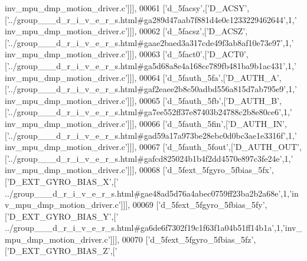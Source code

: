 \begin{DoxyCode}
{      inv\_mpu\_dmp\_motion\_driver.c'}]]],
00061   [\textcolor{stringliteral}{'d\_5facsy'},[\textcolor{stringliteral}{'D\_ACSY'},[\textcolor{stringliteral}{'../group\_\_\_d\_r\_i\_v\_e\_r\_s.html#ga289d47aab7f881d4e0c1233229462644'},1,\textcolor{stringliteral}{'
      inv\_mpu\_dmp\_motion\_driver.c'}]]],
00062   [\textcolor{stringliteral}{'d\_5facsz'},[\textcolor{stringliteral}{'D\_ACSZ'},[\textcolor{stringliteral}{'../group\_\_\_d\_r\_i\_v\_e\_r\_s.html#gaae2baed3a317cde49f3ab8af10e73e97'},1,\textcolor{stringliteral}{'
      inv\_mpu\_dmp\_motion\_driver.c'}]]],
00063   [\textcolor{stringliteral}{'d\_5fact0'},[\textcolor{stringliteral}{'D\_ACT0'},[\textcolor{stringliteral}{'../group\_\_\_d\_r\_i\_v\_e\_r\_s.html#ga5d68a8e4a168cc789fb481ba9b1ac431'},1,\textcolor{stringliteral}{'
      inv\_mpu\_dmp\_motion\_driver.c'}]]],
00064   [\textcolor{stringliteral}{'d\_5fauth\_5fa'},[\textcolor{stringliteral}{'D\_AUTH\_A'},[\textcolor{stringliteral}{'../group\_\_\_d\_r\_i\_v\_e\_r\_s.html#gaf2eaee2b8c50adbd556a815d7ab795e9'},1,\textcolor{stringliteral}{'
      inv\_mpu\_dmp\_motion\_driver.c'}]]],
00065   [\textcolor{stringliteral}{'d\_5fauth\_5fb'},[\textcolor{stringliteral}{'D\_AUTH\_B'},[\textcolor{stringliteral}{'../group\_\_\_d\_r\_i\_v\_e\_r\_s.html#ga7ee552ff37e87403b24788c2b8e80ce6'},1,\textcolor{stringliteral}{'
      inv\_mpu\_dmp\_motion\_driver.c'}]]],
00066   [\textcolor{stringliteral}{'d\_5fauth\_5fin'},[\textcolor{stringliteral}{'D\_AUTH\_IN'},[\textcolor{stringliteral}{'../group\_\_\_d\_r\_i\_v\_e\_r\_s.html#gad59a17a973be28ebc0d0bc3ae1e3316f'},1,\textcolor{stringliteral}{'
      inv\_mpu\_dmp\_motion\_driver.c'}]]],
00067   [\textcolor{stringliteral}{'d\_5fauth\_5fout'},[\textcolor{stringliteral}{'D\_AUTH\_OUT'},[\textcolor{stringliteral}{'../group\_\_\_d\_r\_i\_v\_e\_r\_s.html#gafcd825024b1b4f2dd4570e897c3fe24e'},1,\textcolor{stringliteral}{'
      inv\_mpu\_dmp\_motion\_driver.c'}]]],
00068   [\textcolor{stringliteral}{'d\_5fext\_5fgyro\_5fbias\_5fx'},[\textcolor{stringliteral}{'D\_EXT\_GYRO\_BIAS\_X'},[\textcolor{stringliteral}{'
      ../group\_\_\_d\_r\_i\_v\_e\_r\_s.html#gae48ad5d76a4abec0759ff23ba2b2a68e'},1,\textcolor{stringliteral}{'inv\_mpu\_dmp\_motion\_driver.c'}]]],
00069   [\textcolor{stringliteral}{'d\_5fext\_5fgyro\_5fbias\_5fy'},[\textcolor{stringliteral}{'D\_EXT\_GYRO\_BIAS\_Y'},[\textcolor{stringliteral}{'
      ../group\_\_\_d\_r\_i\_v\_e\_r\_s.html#ga6de6f7302f19c1f63f1a04b51ff14b1a'},1,\textcolor{stringliteral}{'inv\_mpu\_dmp\_motion\_driver.c'}]]],
00070   [\textcolor{stringliteral}{'d\_5fext\_5fgyro\_5fbias\_5fz'},[\textcolor{stringliteral}{'D\_EXT\_GYRO\_BIAS\_Z'},[\textcolor{stringliteral}{'
}
\end{DoxyCode}
